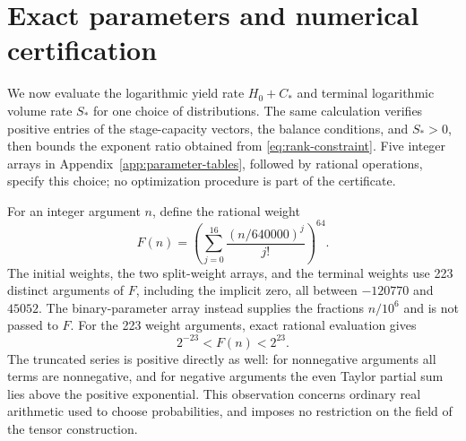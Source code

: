 \section{Exact parameters and numerical certification}\label{sec:parameters}

We now evaluate the logarithmic yield rate $H_0+C_*$ and terminal
logarithmic volume rate $S_*$ for one choice of distributions.
The same calculation verifies positive entries
of the stage-capacity vectors, the balance conditions, and $S_*>0$, then
bounds the exponent ratio obtained from \eqref{eq:rank-constraint}.
Five integer arrays in
Appendix~\ref{app:parameter-tables}, followed by rational operations,
specify this choice; no optimization procedure is part of the certificate.

For an integer argument $n$, define the rational weight
\begin{equation}\label{eq:rational-weight}
 F(n)=\left(\sum_{j=0}^{16}\frac{(n/640000)^j}{j!}\right)^{64}.
\end{equation}
The initial weights, the two split-weight arrays, and the terminal weights
use 223 distinct arguments of $F$, including the implicit zero, all between
$-120770$ and $45052$. The binary-parameter array instead supplies the
fractions $n/10^6$ and is not passed to $F$. For the 223 weight arguments,
exact rational evaluation gives
\begin{equation}\label{eq:weight-bounds}
 2^{-23}<F(n)<2^{23}.
\end{equation}
The truncated series is positive directly as well: for nonnegative arguments
all terms are nonnegative, and for negative arguments the even Taylor partial
sum lies above the positive exponential. This observation concerns ordinary
real arithmetic used to choose probabilities, and imposes no restriction on
the field of the tensor construction.

